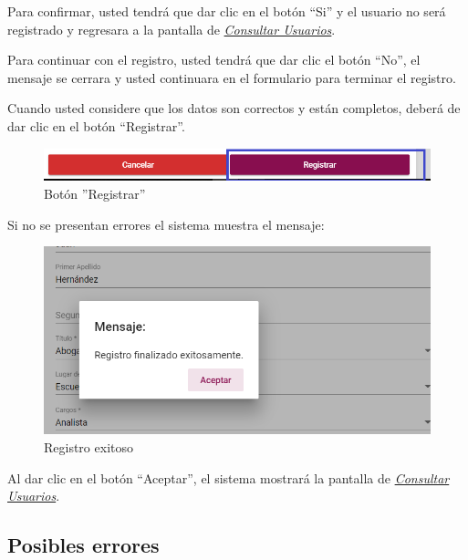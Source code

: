             Para confirmar, usted tendrá que dar clic en el botón “Si” y el usuario no será registrado y regresara a la pantalla de \hyperlink{consultarUs}{\textit{Consultar Usuarios}}.
            
            Para continuar con el registro, usted tendrá que  dar clic el botón “No”, el mensaje se cerrara y usted continuara en el formulario para terminar el registro.
            
            Cuando usted considere que los datos son correctos y están completos, deberá de dar clic en el botón “Registrar”.
            
            \begin{figure}[!hbtp]
                \centering
                \hypertarget{btnreg}{\includegraphics[width=0.7\linewidth]{images/SP5/BtnRegistrar}}
                \caption{Botón ''Registrar''}
                \label{btnreg}
            \end{figure}
            
            Si no se presentan errores el sistema muestra el mensaje:
            
            	 
             \begin{figure}[!hbtp]
            	\centering
            \includegraphics[width=0.4\linewidth]{images/SP5/MSG5}
            	\caption{Registro exitoso}
            	\label{mensaje5}
            	
            \end{figure}
        
            Al dar clic en el botón “Aceptar”, el sistema mostrará la pantalla de  \hyperlink{consultarUs}{\textit{Consultar Usuarios}}.
    
            \subsection{Posibles errores} 
        
